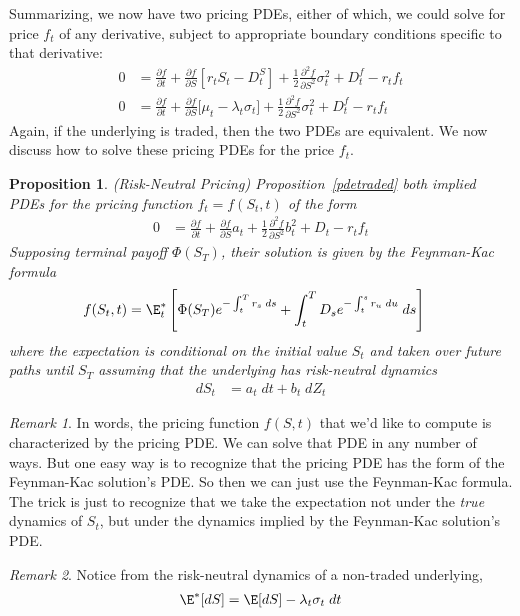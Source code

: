 \documentclass[12pt]{article}
\theoremstyle{plain}
\newtheorem{prop}[thm]{Proposition}
\theoremstyle{definition}
\theoremstyle{remark}
\newtheorem*{rmk}{Remark}
\begin{document}
Summarizing, we now have two pricing PDEs, either of which, we could
solve for price $f_t$ of any derivative, subject to appropriate boundary
conditions specific to that derivative:
\begin{align*}
  0
  &=
  \frac{\partial f}{\partial t}
  +
  \frac{\partial f}{\partial S}
  \left[
  r_t
  S_t
  - D_t^S
  \right]
  +
  \frac{1}{2}
  \frac{\partial^2 f}{\partial S^2}
  \sigma^2_t
  +
  D_t^f
  -
  r_t
  f_t
  \\
  0
  &=
  \frac{\partial f}{\partial t}
  +
  \frac{\partial f}{\partial S}
  \big[
  \mu_t
  -
  \lambda_t
  \sigma_t
  \big]
  +
  \frac{1}{2}
  \frac{\partial^2 f}{\partial S^2}
  \sigma_t^2
  + D_t^f - r_tf_t
\end{align*}
Again, if the underlying is traded, then the two PDEs are equivalent.
We now discuss how to solve these pricing PDEs for the price $f_t$.

\begin{prop}\emph{(Risk-Neutral Pricing)}
Proposition~\ref{pdetraded} both implied
PDEs for the pricing function $f_t=f(S_t,t)$ of the form
\begin{align*}
  0
  &=
  \frac{\partial f}{\partial t}
  +
  \frac{\partial f}{\partial S}
  a_t
  +
  \frac{1}{2}
  \frac{\partial^2 f}{\partial S^2}
  b_t^2
  +
  D_t
  -
  r_t
  f_t
\end{align*}
Supposing terminal payoff $\Phi(S_T)$, their solution is given by the
Feynman-Kac formula
\begin{align*}
  f(S_t,t)
  &=
  \E^*_t\left[
    \Phi(S_T)
    e^{-\int_t^T r_s\;ds}
    +
    \int_t^T
    D_s
    e^{-\int_t^s r_u\;du}
    \;ds
  \right]
\end{align*}
where the expectation is conditional on the initial value $S_t$ and
taken over future paths until $S_T$ assuming that the underlying has
\emph{risk-neutral dynamics}
\begin{align*}
  dS_t
  &= a_t\;dt + b_t\;dZ_t
\end{align*}
\end{prop}
\begin{rmk}
In words, the pricing function $f(S,t)$ that we'd like to compute is
characterized by the pricing PDE.
We can solve that PDE in any number of ways.
But one easy way is to recognize that the pricing PDE has the form of
the Feynman-Kac solution's PDE.
So then we can just use the Feynman-Kac formula.
The trick is just to recognize that we take the expectation not under
the \emph{true} dynamics of $S_t$, but under the dynamics implied by the
Feynman-Kac solution's PDE.
\end{rmk}
\begin{rmk}
Notice from the risk-neutral dynamics of a non-traded underlying,
\begin{align*}
  \E^*[dS]
  =
  \E[dS] - \lambda_t \sigma_t\;dt
\end{align*}

\end{rmk}
\end{document}

